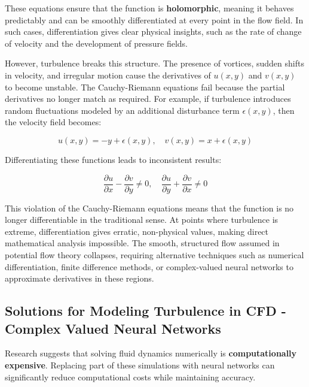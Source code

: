 \documentclass[a4paper,10.5pt]{article}
\begin{document}
These equations ensure that the function is \textbf{holomorphic}, meaning it behaves predictably and can be smoothly differentiated at every point in the flow field. In such cases, differentiation gives clear physical insights, such as the rate of change of velocity and the development of pressure fields.

\vspace{0.5cm}

However, turbulence breaks this structure. The presence of vortices, sudden shifts in velocity, and irregular motion cause the derivatives of $u(x,y)$ and $v(x,y)$ to become unstable. The Cauchy-Riemann equations fail because the partial derivatives no longer match as required. For example, if turbulence introduces random fluctuations modeled by an additional disturbance term $\epsilon(x,y)$, then the velocity field becomes:

\begin{equation}
    u(x,y)=-y+\epsilon(x,y), \quad v(x,y)=x+\epsilon(x,y)
\end{equation}

Differentiating these functions leads to inconsistent results:

\begin{equation}
    \frac{\partial u}{\partial x} - \frac{\partial v}{\partial y} \neq 0, \quad \frac{\partial u}{\partial y} + \frac{\partial v}{\partial x} \neq 0
\end{equation}

This violation of the Cauchy-Riemann equations means that the function is no longer differentiable in the traditional sense. At points where turbulence is extreme, differentiation gives erratic, non-physical values, making direct mathematical analysis impossible. The smooth, structured flow assumed in potential flow theory collapses, requiring alternative techniques such as numerical differentiation, finite difference methods, or complex-valued neural networks to approximate derivatives in these regions.

\subsection{Solutions for Modeling Turbulence in CFD - Complex Valued Neural Networks}

Research suggests that solving fluid dynamics numerically is \textbf{computationally expensive}. Replacing part of these simulations with neural networks can significantly reduce computational costs while maintaining accuracy.
\end{document}
